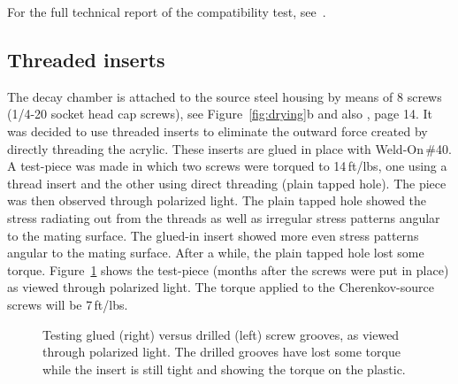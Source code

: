 For the full technical report of the compatibility test, see~\cite{lina:2015}.

\subsection{Threaded inserts}
\label{sec:inserts}
The decay chamber is attached to the source steel housing by means of 8 screws (1/4-20 socket head cap screws), see Figure~\ref{fig:drying}b and also \cite{wallig:2015}, page 14. It was decided to use threaded inserts to eliminate the outward force created by directly threading the acrylic. These inserts are glued in place with Weld-On\,\#40. A test-piece was made in which two screws were torqued to 14\,ft/lbs, one using a thread insert and the other using direct threading (plain tapped hole). The piece was then observed through polarized light. The plain tapped hole showed the stress radiating out from the threads as well as irregular stress patterns angular to the mating surface. The glued-in insert showed more even stress patterns angular to the mating surface. After a while, the plain tapped hole lost some torque. Figure~\ref{fig:nutts} shows the test-piece (months after the screws were put in place) as viewed through polarized light. The torque applied to the Cherenkov-source screws will be 7\,ft/lbs.

\begin{figure}
\caption{\label{fig:nutts} Testing glued (right) versus drilled (left) screw grooves, as viewed through polarized light. The drilled grooves have lost some torque while the insert is still tight and showing the torque on the plastic. }
\end{figure}

